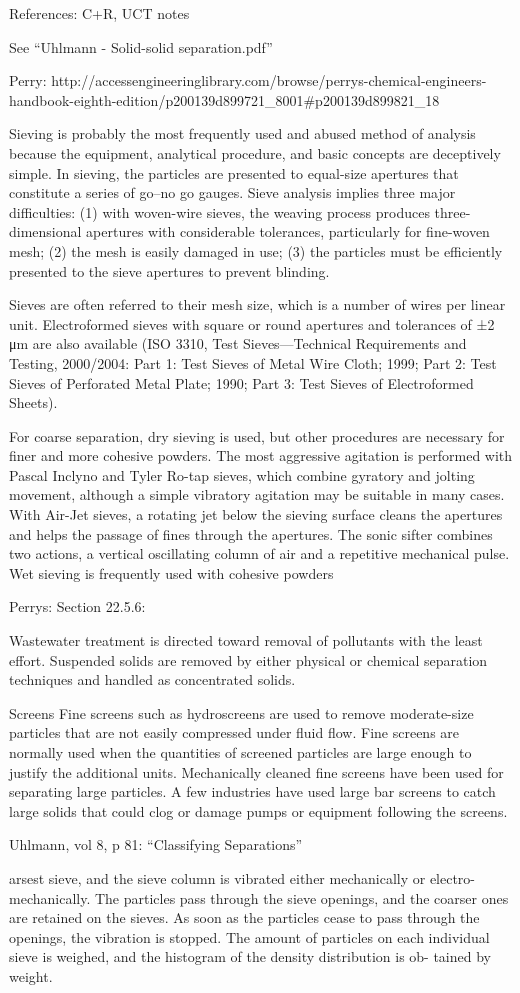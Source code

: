 References: C+R, UCT notes

See ``Uhlmann - Solid-solid separation.pdf''

Perry: http://accessengineeringlibrary.com/browse/perrys-chemical-engineers-handbook-eighth-edition/p200139d899721_8001#p200139d899821_18

Sieving is probably the most frequently used and abused method of analysis because the equipment, analytical procedure, and basic concepts are deceptively simple. In sieving, the particles are presented to equal-size apertures that constitute a series of go–no go gauges. Sieve analysis implies three major difficulties: (1) with woven-wire sieves, the weaving process produces three-dimensional apertures with considerable tolerances, particularly for fine-woven mesh; (2) the mesh is easily damaged in use; (3) the particles must be efficiently presented to the sieve apertures to prevent blinding.

Sieves are often referred to their mesh size, which is a number of wires per linear unit. Electroformed sieves with square or round apertures and tolerances of ±2 μm are also available (ISO 3310, Test Sieves—Technical Requirements and Testing, 2000/2004: Part 1: Test Sieves of Metal Wire Cloth; 1999; Part 2: Test Sieves of Perforated Metal Plate; 1990; Part 3: Test Sieves of Electroformed Sheets).

For coarse separation, dry sieving is used, but other procedures are necessary for finer and more cohesive powders. The most aggressive agitation is performed with Pascal Inclyno and Tyler Ro-tap sieves, which combine gyratory and jolting movement, although a simple vibratory agitation may be suitable in many cases. With Air-Jet sieves, a rotating jet below the sieving surface cleans the apertures and helps the passage of fines through the apertures. The sonic sifter combines two actions, a vertical oscillating column of air and a repetitive mechanical pulse. Wet sieving is frequently used with cohesive powders

Perrys: Section 22.5.6:

Wastewater treatment is directed toward removal of pollutants with the least effort. Suspended solids are removed by either physical or chemical separation techniques and handled as concentrated solids.

Screens Fine screens such as hydroscreens are used to remove moderate-size particles that are not easily compressed under fluid flow. Fine screens are normally used when the quantities of screened particles are large enough to justify the additional units. Mechanically cleaned fine screens have been used for separating large particles. A few industries have used large bar screens to catch large solids that could clog or damage pumps or equipment following the screens.

Uhlmann, vol 8, p 81: ``Classifying Separations''

arsest sieve, and the sieve column is vibrated either mechanically or electro-mechanically. The particles pass through the sieve openings, and the coarser ones are retained on the sieves. As soon as the particles cease to pass through the openings, the vibration is stopped. The amount of particles on each individual sieve is weighed, and the histogram of the density distribution is ob- tained by weight.